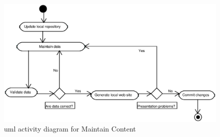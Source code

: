 \documentclass{elsart}
\begin{document}
\begin{figure}
\includegraphics[scale=0.6]{maintain-content-activity}
\caption{{\sc uml} activity diagram for Maintain Content}
\label{fig:maintain-content-diagram}
\end{figure}
\end{document}

